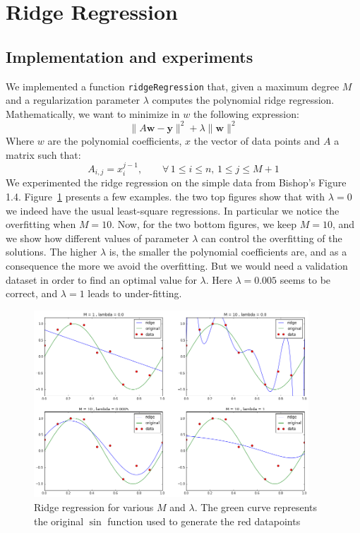 \section{Ridge Regression}
\subsection{Implementation and experiments}
We implemented a function {\tt ridgeRegression} that, given a maximum degree $M$ and a regularization parameter $\lambda$ computes the polynomial ridge regression. Mathematically, we want to minimize in $w$ the following expression:
\begin{equation*}
    \|A\mathbf{w} - \mathbf{y}\|^2 + \lambda \|\mathbf{w}\|^2
\end{equation*}
Where $w$ are the polynomial coefficients, $x$ the vector of data points and $A$ a matrix such that:
\begin{equation*}
    A_{i,j} = x_i^{j-1}, \qquad \forall \, 1 \leq i \leq n, \, 1 \leq j \leq M+1
\end{equation*}
We experimented the ridge regression on the simple data from Bishop's Figure 1.4. Figure~\ref{fig:ridge1} presents a few examples. the two top figures show that with $\lambda = 0$ we indeed have the usual least-square regressions. In particular we notice the overfitting when $M=10$. Now, for the two bottom figures, we keep $M =10$, and we show how different values of parameter $\lambda$ can control the overfitting of the solutions. The higher $\lambda$ is, the smaller the polynomial coefficients are, and as a consequence the more we avoid the overfitting. But we would need a validation dataset in order to find an optimal value for $\lambda$. Here $\lambda = 0.005$ seems to be correct, and $\lambda = 1$ leads to under-fitting.

\begin{figure}[h]
  \centering
 \includegraphics[width=10.3cm]{../Figures/Q3/ridge1.png}
\caption{Ridge regression for various $M$ and $\lambda$. The green curve represents the original $\sin$ function used to generate the red datapoints}
\label{fig:ridge1}
\end{figure}


